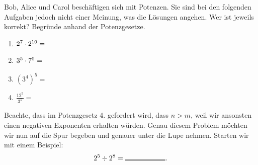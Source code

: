 \documentclass[11pt,oneside]{article}
\begin{document}
	\begin{aufgabe}
		Bob, Alice und Carol beschäftigen sich mit Potenzen. Sie sind bei den folgenden Aufgaben jedoch nicht einer Meinung, was die Lösungen angehen. Wer ist jeweils korrekt? Begründe anhand der Potenzgesetze.
		\begin{enumerate}[label=\alph*)]
			\item$2^7\cdot2^{10}=$\begin{enumerate}\end{enumerate}
			\item$3^5\cdot7^5=$\begin{enumerate}\end{enumerate}
			\item$\left(3^4\right)^5=$\begin{enumerate}\end{enumerate}
			\item$\frac{12^5}{3^5}=$\begin{enumerate}\end{enumerate}
		\end{enumerate}
	\end{aufgabe}
	Beachte, dass im Potenzgesetz 4. gefordert wird, dass $n>m$, weil wir ansonsten einen negativen Exponenten erhalten würden. Genau diesem Problem möchten wir nun auf die Spur begeben und genauer unter die Lupe nehmen. Starten wir mit einem Beispiel: \[2^5\div2^8=\gap{2}.\]
\end{document}

